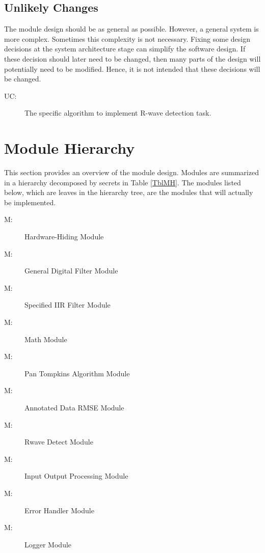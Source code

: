 \documentclass[12pt, titlepage]{article}
\newcounter{ucnum}
\newcommand{\uctheucnum}{UC\theucnum}
\newcounter{mnum}
\newcommand{\mthemnum}{M\themnum}
\begin{document}
\subsection{Unlikely Changes} \label{SecUchange}

The module design should be as general as possible. However, a general system is
more complex. Sometimes this complexity is not necessary. Fixing some design
decisions at the system architecture stage can simplify the software design. If
these decision should later need to be changed, then many parts of the design
will potentially need to be modified. Hence, it is not intended that these
decisions will be changed.

\begin{description}
\item[ \uctheucnum \label{ucAlg}:] The specific algorithm to implement R-wave detection task.
\end{description}

\section{Module Hierarchy} \label{SecMH}

This section provides an overview of the module design. Modules are summarized
in a hierarchy decomposed by secrets in Table \ref{TblMH}. The modules listed
below, which are leaves in the hierarchy tree, are the modules that will
actually be implemented.

\begin{description}
\item [ \mthemnum \label{mHH}:] Hardware-Hiding Module
\item [ \mthemnum \label{mGDF}:] General Digital Filter
Module
\item [ \mthemnum \label{mSIIR}:] Specified IIR Filter
Module
\item [ \mthemnum \label{mMath}:] Math Module
\item [ \mthemnum \label{mAlg}:] Pan Tompkins Algorithm
Module
\item [ \mthemnum \label{mRMSE}:] Annotated Data RMSE
Module
\item [ \mthemnum \label{mRwave}:] Rwave Detect Module
\item [ \mthemnum \label{mIO}:] Input Output Processing
Module
\item [ \mthemnum \label{mError}:] Error Handler Module
\item [ \mthemnum \label{mLogger}:] Logger Module
\end{description}
\end{document}
